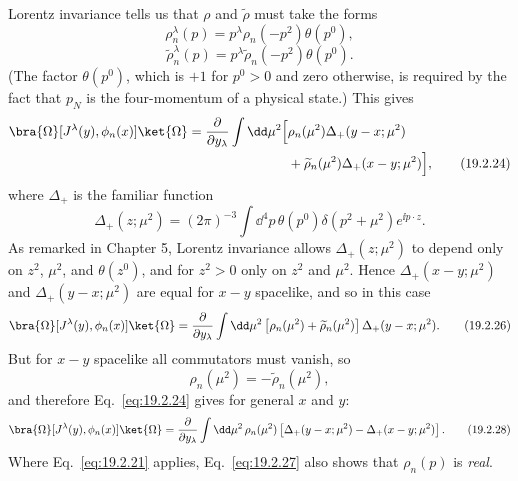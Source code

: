 Lorentz invariance tells us that $\rho$ and $\widetilde\rho$ must take the
forms
\begin{equation}
 \rho_n^\lambda(p)=p^\lambda\rho_n(-p^2)\theta(p^0),
 \tag{19.2.22}\label{eq:19.2.22}
\end{equation}
\begin{equation}
 \widetilde\rho_n^\lambda(p)
 =p^\lambda\widetilde\rho_n(-p^2)\theta(p^0).
 \tag{19.2.23}\label{eq:19.2.23}
\end{equation}
(The factor $\theta(p^0)$, which is $+1$ for $p^0>0$ and zero otherwise, is
required by the fact that $p_N$ is the four-momentum of a physical state.)
This gives
\begin{align}
 \bra{\Omega}[J^\lambda(y),\phi_n(x)]\ket{\Omega}
 =\frac{\partial}{\partial y_\lambda}\int \dd\mu^2
 \Bigl[&
 \rho_n(\mu^2)\Delta_+(y-x;\mu^2)
 \notag\\
 &+\widetilde\rho_n(\mu^2)\Delta_+(x-y;\mu^2)\Bigr],
 \tag{19.2.24}\label{eq:19.2.24}
\end{align}
where $\Delta_+$ is the familiar function
\begin{equation}
 \Delta_+(z;\mu^2)=(2\pi)^{-3}\int
 \dd^4p\,\theta(p^0)\delta(p^2+\mu^2)e^{\ii p\cdot z}.
 \tag{19.2.25}\label{eq:19.2.25}
\end{equation}
As remarked in Chapter 5, Lorentz invariance allows
$\Delta_+(z;\mu^2)$ to depend only on $z^2$, $\mu^2$, and $\theta(z^0)$, and
for $z^2>0$ only on $z^2$ and $\mu^2$. Hence
$\Delta_+(x-y;\mu^2)$ and $\Delta_+(y-x;\mu^2)$ are equal for $x-y$
spacelike, and so in this case
\begin{equation}
 \bra{\Omega}[J^\lambda(y),\phi_n(x)]\ket{\Omega}
 =\frac{\partial}{\partial y_\lambda}\int \dd\mu^2
 \left[\rho_n(\mu^2)+\widetilde\rho_n(\mu^2)\right]
 \Delta_+(y-x;\mu^2).
 \tag{19.2.26}\label{eq:19.2.26}
\end{equation}
But for $x-y$ spacelike all commutators must vanish, so
\begin{equation}
 \rho_n(\mu^2)=-\widetilde\rho_n(\mu^2),
 \tag{19.2.27}\label{eq:19.2.27}
\end{equation}
and therefore Eq.~\eqref{eq:19.2.24} gives for general $x$ and $y$:
\begin{equation}
 \bra{\Omega}[J^\lambda(y),\phi_n(x)]\ket{\Omega}
 =\frac{\partial}{\partial y_\lambda}\int \dd\mu^2\,\rho_n(\mu^2)
 \left[\Delta_+(y-x;\mu^2)-\Delta_+(x-y;\mu^2)\right].
 \tag{19.2.28}\label{eq:19.2.28}
\end{equation}
Where Eq.~\eqref{eq:19.2.21} applies, Eq.~\eqref{eq:19.2.27} also shows that
$\rho_n(p)$ is \emph{real}.

